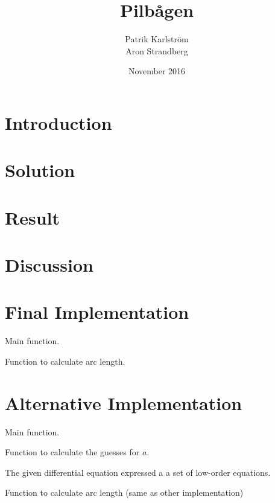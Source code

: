 \documentclass{article}
\title{Pilbågen}
\author{Patrik Karlström \\ Aron Strandberg }
\date{November 2016}
\begin{document}
\maketitle

\section{Introduction}



\section{Solution}



\section{Result}



\section{Discussion}



\newpage
\appendix
\section{Final Implementation} \label{app:Appendix A}
Main function.
%

Function to calculate arc length.
%

\appendix
\section{Alternative Implementation} \label{app:Appendix B}
Main function.
%

Function to calculate the guesses for $a$.
%

The given differential equation expressed a a set of low-order equations.
%

Function to calculate arc length (same as other implementation)
%
\end{document}
